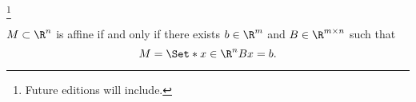 
\footnote{Future editions will include.}


\begin{prop}
$M \subset \R^{n}$ is affine if and only if there exists
$b \in \R^m$ and $B \in \R^{m \times n}$ such that
$$
  M = \Set*{x \in \R^{n}}{Bx = b}.
$$
\end{prop}

\blankpage
